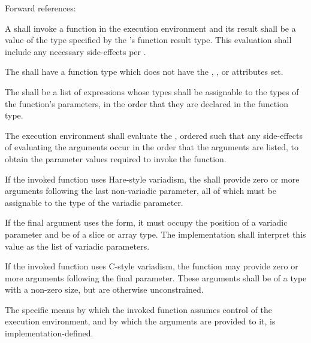 Forward references: 

\specsubsubitem
A  shall invoke a function in the execution
environment and its result shall be a value of the type specified by the
's function result type. This evaluation shall
include any necessary side-effects per .

\specsubsubitem
The  shall have a function type which does not
have the , , or  attributes set.

\specsubsubitem
The  shall be a list of expressions whose types
shall be assignable to the types of the function's parameters, in the order
that they are declared in the function type.

\specsubsubitem
The execution environment shall evaluate the ,
ordered such that any side-effects of evaluating the arguments occur in the
order that the arguments are listed, to obtain the parameter values required to
invoke the function.

\specsubsubitem
If the invoked function uses Hare-style variadism, the
 shall provide zero or more arguments following the
last non-variadic parameter, all of which must be assignable to the type of the
variadic parameter.

\specsubsubitem
If the final argument uses the  form, it must occupy the position of a
variadic parameter and be of a slice or array type. The implementation shall
interpret this value as the list of variadic parameters.

\specsubsubitem
If the invoked function uses C-style variadism, the function may provide zero
or more arguments following the final parameter. These arguments shall be of a
type with a non-zero size, but are otherwise unconstrained.

\specsubsubitem
The specific means by which the invoked function assumes control of the
execution environment, and by which the arguments are provided to it, is
implementation-defined.



